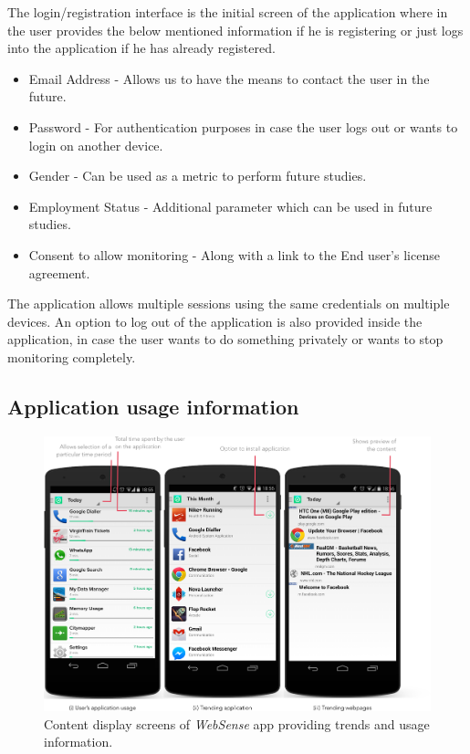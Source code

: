 \documentclass[12pt]{report}
\begin{document}
The login/registration interface is the initial screen of the application where in the user provides the below mentioned information if he is registering or just logs into the application if he has already registered.

\begin{itemize}
\item Email Address - Allows us to have the means to contact the user in the future.
\item Password - For authentication purposes in case the user logs out or wants to login on another device.
\item Gender - Can be used as a metric to perform future studies.
\item Employment Status - Additional parameter which can be used in future studies.
\item Consent to allow monitoring - Along with a link to the End user's license agreement.
\end{itemize}


The application allows multiple sessions using the same credentials on multiple devices. An option to log out of the application is also provided inside the application, in case the user wants to do something privately or wants to stop monitoring completely.

\subsection{Application usage information}
\label{AppUsageInfo}

\begin{figure}[htbp]
 \centering
 \includegraphics[width=150mm]{AppListScreen.png}
  \caption[Content display screens of \textit{WebSense} app.]{Content display screens of \textit{WebSense} app providing trends and usage information.}
 \label{figure:SensorInformation}
\end{figure}
\end{document}
